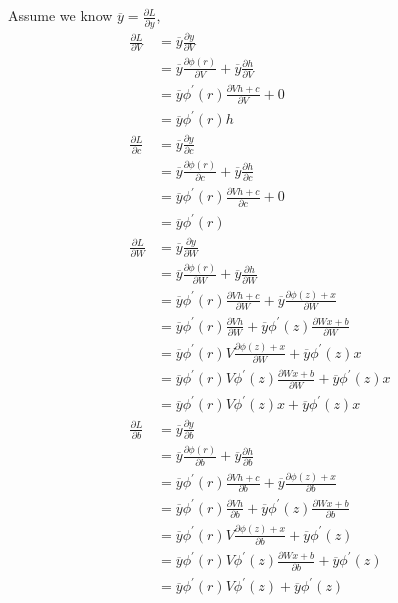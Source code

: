 \documentclass{article}
\begin{document}
\subsection{}
Assume we know $\overline{y} = \frac{\partial L}{\partial y} $, 
\begin{align*}
    \frac{\partial L}{\partial V} &= \overline{y}\frac{\partial y}{\partial V}\\
    &= \overline{y}\frac{\partial \phi (r)}{\partial V}+\overline{y}\frac{\partial h}{\partial V}\\
    &= \overline{y}\phi ^\prime (r)\frac{\partial Vh+c}{\partial V}+0\\
    &= \overline{y}\phi ^\prime (r)h\\
    \frac{\partial L}{\partial c} &= \overline{y}\frac{\partial y}{\partial c}\\
    &= \overline{y}\frac{\partial \phi (r)}{\partial c}+\overline{y}\frac{\partial h}{\partial c}\\
    &= \overline{y}\phi ^\prime (r)\frac{\partial Vh+c}{\partial c}+0\\
    &= \overline{y}\phi ^\prime (r)\\
    \frac{\partial L}{\partial W} &= \overline{y}\frac{\partial y}{\partial W}\\
    &= \overline{y}\frac{\partial \phi (r)}{\partial W}+\overline{y}\frac{\partial h}{\partial W}\\
    &= \overline{y}\phi ^\prime (r)\frac{\partial Vh+c}{\partial W}+\overline{y}\frac{\partial \phi (z) + x}{\partial W}\\
    &= \overline{y}\phi ^\prime (r)\frac{\partial Vh}{\partial W}+\overline{y}\phi ^\prime (z)\frac{\partial Wx+b}{\partial W}\\
    &= \overline{y}\phi ^\prime (r)V\frac{\partial \phi (z)+x}{\partial W}+\overline{y}\phi ^\prime (z)x\\
    &= \overline{y}\phi ^\prime (r)V\phi ^\prime (z)\frac{\partial Wx+b}{\partial W}+\overline{y}\phi ^\prime (z)x\\
    &= \overline{y}\phi ^\prime (r)V\phi ^\prime (z)x+\overline{y}\phi ^\prime (z)x\\
    \frac{\partial L}{\partial b} &= \overline{y}\frac{\partial y}{\partial b}\\
    &= \overline{y}\frac{\partial \phi (r)}{\partial b}+\overline{y}\frac{\partial h}{\partial b}\\
    &= \overline{y}\phi ^\prime (r)\frac{\partial Vh+c}{\partial b}+\overline{y}\frac{\partial \phi (z) + x}{\partial b}\\
    &= \overline{y}\phi ^\prime (r)\frac{\partial Vh}{\partial b}+\overline{y}\phi ^\prime (z)\frac{\partial Wx+b}{\partial b}\\
    &= \overline{y}\phi ^\prime (r)V\frac{\partial \phi (z)+x}{\partial b}+\overline{y}\phi ^\prime (z)\\
    &= \overline{y}\phi ^\prime (r)V\phi ^\prime (z)\frac{\partial Wx+b}{\partial b}+\overline{y}\phi ^\prime (z)\\
    &= \overline{y}\phi ^\prime (r)V\phi ^\prime (z)+\overline{y}\phi ^\prime (z)\\
\end{align*}
\end{document}
